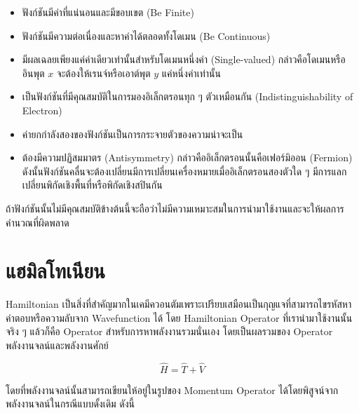 \begin{itemize}[topsep=0pt]
    \item ฟังก์ชันมีค่าที่แน่นอนและมีขอบเขต (Be Finite)
    
    \item ฟังก์ชันมีความต่อเนื่องและหาค่าได้ตลอดทั้งโดเมน (Be Continuous)
    
    \item มีผลเฉลยเพียงแค่ค่าเดียวเท่านั้นสำหรับโดเมนหนึ่งค่า (Single-valued) กล่าวคือโดเมนหรืออินพุต $x$ จะต้องให้เรนจ์หรือเอาต์พุต 
    $y$ แค่หนึ่งค่าเท่านั้น
    
    \item เป็นฟังก์ชันที่มีคุณสมบัติในการมองอิเล็กตรอนทุก ๆ ตัวเหมือนกัน (Indistinguishability of Electron)
    
    \item ค่ายกกำลังสองของฟังก์ชันเป็นการกระจายตัวของความน่าจะเป็น
    
    \item ต้องมีความปฏิสมมาตร (Antisymmetry) กล่าวคืออิเล็กตรอนนั้นคือเฟอร์มิออน (Fermion)\autocite{atkins2010} 
    ดังนั้นฟังก์ชันคลื่นจะต้องเปลี่ยนมีการเปลี่ยนเครื่องหมายเมื่ออิเล็กตรอนสองตัวใด ๆ มีการแลกเปลี่ยนพิกัดเชิงพื้นที่หรือพิกัดเชิงสปินกัน
\end{itemize}

ถ้าฟังก์ชันนั้นไม่มีคุณสมบัติข้างต้นนี้จะถือว่าไม่มีความเหมาะสมในการนำมาใช้งานและจะให้ผลการคำนวณที่ผิดพลาด

\section{แฮมิลโทเนียน}
\label{sec:hamiltonian}

Hamiltonian เป็นสิ่งที่สำคัญมากในเคมีควอนตัมเพราะเปรียบเสมือนเป็นกุญแจที่สามารถไขรหัสหาคำตอบหรือความลับจาก Wavefunction ได้
โดย Hamiltonian Operator ที่เรานำมาใช้งานนั้นจริง ๆ แล้วก็คือ Operator สำหรับการหาพลังงานรวมนั่นเอง โดยเป็นผลรวมของ Operator 
พลังงานจลน์และพลังงานศักย์

\begin{equation}\label{eq:hamil}
    \hat{H} = \hat{T} + \hat{V}
\end{equation}

\noindent โดยที่พลังงานจลน์นั้นสามารถเขียนให้อยู่ในรูปของ Momentum Operator ได้โดยพิสูจน์จากพลังงานจลน์ในกรณีแบบดั้งเดิม ดังนี้

